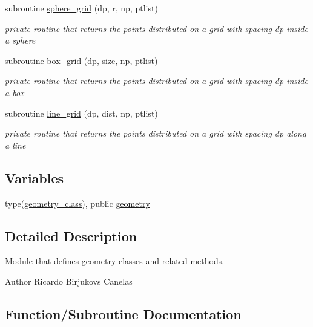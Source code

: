 \begin{DoxyCompactItemize}
subroutine \hyperlink{namespacegeometry__mod_a6c03a4ea3de6763940396dbeb3908ebc}{sphere\+\_\+grid} (dp, r, np, ptlist)
\begin{DoxyCompactList}\small\item\em private routine that returns the points distributed on a grid with spacing dp inside a sphere \end{DoxyCompactList}\item 
subroutine \hyperlink{namespacegeometry__mod_ae87e4ecff2d21a839da2b82919b5fd0b}{box\+\_\+grid} (dp, size, np, ptlist)
\begin{DoxyCompactList}\small\item\em private routine that returns the points distributed on a grid with spacing dp inside a box \end{DoxyCompactList}\item 
subroutine \hyperlink{namespacegeometry__mod_abcb09c0f5274c27cb79b0dd009ed94b3}{line\+\_\+grid} (dp, dist, np, ptlist)
\begin{DoxyCompactList}\small\item\em private routine that returns the points distributed on a grid with spacing dp along a line \end{DoxyCompactList}\end{DoxyCompactItemize}
\subsection*{Variables}
\begin{DoxyCompactItemize}
\item 
type(\hyperlink{structgeometry__mod_1_1geometry__class}{geometry\+\_\+class}), public \hyperlink{namespacegeometry__mod_ad2ad4f7e1138beaad5f37d5c15b7b457}{geometry}
\end{DoxyCompactItemize}


\subsection{Detailed Description}
Module that defines geometry classes and related methods. 

\begin{DoxyAuthor}{Author}
Ricardo Birjukovs Canelas 
\end{DoxyAuthor}


\subsection{Function/\+Subroutine Documentation}
\mbox{\label{namespacegeometry__mod_a1b6f259b0b6be71e02ffae7670f7d8ba}} 

